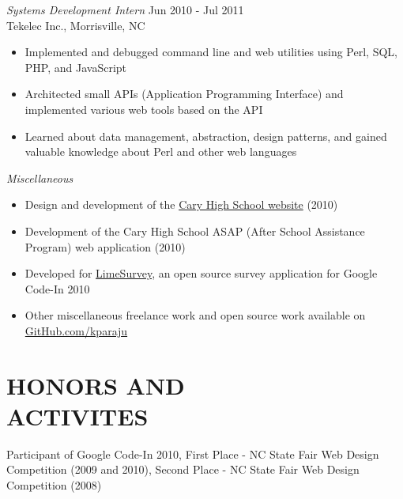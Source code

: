 \documentclass[margin]{res}
\begin{document}
\begin{resume}
                {\sl Systems Development Intern} \hfill Jun 2010 - Jul 2011 \\
                Tekelec Inc., Morrisville, NC
                \begin{itemize}  \itemsep -2pt %
                \item 
                  Implemented and debugged command line and web utilities using Perl, SQL, PHP, and JavaScript
                \item
                  Architected small APIs (Application Programming Interface) and implemented various web tools based on the API
                \item
                  Learned about data management, abstraction, design patterns, and gained valuable 
                  knowledge about Perl and other web languages
                \end{itemize}

                {\sl Miscellaneous }
                \begin{itemize}  \itemsep -2pt %
                \item 
                  Design and development of the \href{http://caryhs.wcpss.net/}{Cary High School website} (2010)
                \item
                  Development of the Cary High School ASAP (After School Assistance Program) web application (2010)
                \item
                  Developed for \href{http://www.limesurvey.org/}{LimeSurvey}, an open source survey application for Google Code-In 2010
                \item
                  Other miscellaneous freelance work and open source work available on \\
                  \href{https://github.com/kparaju}{GitHub.com/kparaju} 
                \end{itemize}


\section{HONORS AND \\ ACTIVITES}
            Participant of Google Code-In 2010, 
            First Place - NC State Fair Web Design Competition (2009 and 2010),
            Second Place - NC State Fair Web Design Competition (2008)
 
\end{resume}
\end{document}
